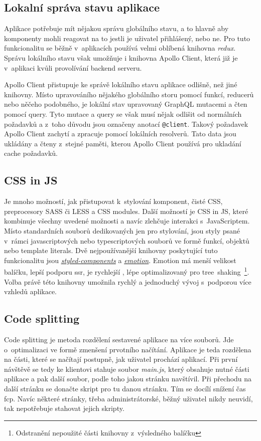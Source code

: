 \subsection{Lokalní správa stavu aplikace}
\label{ss:local_state_management}
Aplikace potřebuje mít nějakou správu globálního stavu, a to hlavně aby komponenty mohli reagovat na to jestli je uživatel přihlášený, nebo ne. Pro tuto funkcionalitu se běžně v~aplikacích používá velmi oblíbená knihovna \emph{redux}. Správu lokálního stavu však umožňuje i knihovna Apollo Client, která již je v~aplikaci kvůli provolívání backend serveru.

Apollo Client přistupuje ke správě lokálního stavu aplikace odlišně, než jiné knihovny. Místo upravováního nějakého globálního storu pomocí funkcí, reducerů nebo něčeho podobného, je lokální stav upravovaný GraphQL mutacemi a čten pomocí query. Tyto mutace a query se však musí nějak odlišit od normálních požadavků a z~toho důvodu jsou označeny anotací \texttt{@client}. Takový požadavek Apollo Client zachytí a zpracuje pomocí lokálních resolverů. Tato data jsou ukládány a čteny z~stejné paměti, kterou Apollo Client používá pro ukladání cache požadavků.

\subsection{CSS in JS}
\label{ss:css_in_js}
Je mnoho možností, jak přistupovat k~stylování komponent, čisté CSS, preprocesory SASS či LESS a CSS modules. Další možností je CSS in JS, které kombinuje všechny uvedené možnosti a navíc zlehčuje interakci s~JavaScriptem. Místo standardních souborů dedikovaných jen pro stylování, jsou styly psané v~rámci javascriptových nebo typescriptových souborů ve formě funkcí, objektů nebo template literals. Dvě nejpoužívanější knihovny poskytující tuto funkcionalitu jsou \href{https://styled-components.com/}{\emph{styled-components}} a \href{https://emotion.sh/}{\emph{emotion}}. Emotion má menší velikost balíčku, lepší podporu \acrshort{ssr}, je rychlejší \cite{shehet_2020_css}, lépe optimalizovaný pro tree~shaking~\footnote{Odstranění nepoužité části knihovny z~výsledného balíčku}. Volba právě této knihovny umožnila rychlý a jednoduchý vývoj s~podporou více vzhledů aplikace.

\subsection{Code splitting}
\label{ss:code_splitting}
Code splitting je metoda rozdělení sestavené aplikace na více souborů. Jde o~optimalizaci ve formě zmenšení prvotního načítání. Aplikace je teda rozdělena na části, které se načítají postupně, jak uživatel prochází aplikací. Při první návštěvě se tedy ke klientovi stahuje soubor \emph{main.js}, který obsahuje nutné části aplikace a pak další soubor, podle toho jakou stránku navštívil. Při přechodu na další stránku se donačte skript pro tu danou stránku. Tím se docílí snížení čas \acrshort{fcp}. Navíc některé stránky, třeba administrátorské, běžný uživatel nikdy neuvidí, tak nepotřebuje stahovat jejich skripty.


